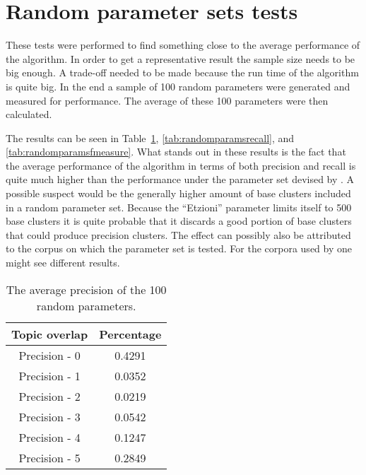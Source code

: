 \section{Random parameter sets tests}

These tests were performed to find something close to the average performance of the algorithm. In order to get a representative result the sample size needs to be big enough. A trade-off needed to be made because the run time of the algorithm is quite big. In the end a sample of 100 random parameters were generated and measured for performance. The average of these 100 parameters were then calculated.

The results can be seen in Table~\ref{tab:randomparamsprecision}, \ref{tab:randomparamsrecall}, and \ref{tab:randomparamsfmeasure}. What stands out in these results is the fact that the average performance of the algorithm in terms of both precision and recall is quite much higher than the performance under the parameter set devised by \cite{Oren1998}. A possible suspect would be the generally higher amount of base clusters included in a random parameter set. Because the ``Etzioni'' parameter limits itself to 500 base clusters it is quite probable that it discards a good portion of base clusters that could produce precision clusters. The effect can possibly also be attributed to the corpus on which the parameter set is tested. For the corpora used by \cite{Oren1998} one might see different results.

\begin{table}[H]
\begin{center}
\begin{tabular}{|c|c|}
\hline
Topic overlap & Percentage\\ 
\hline
Precision - 0 & 0.4291\\
Precision - 1 & 0.0352\\
Precision - 2 & 0.0219\\
Precision - 3 & 0.0542\\
Precision - 4 & 0.1247\\
Precision - 5 & 0.2849\\
\hline
\end{tabular}
\end{center}
\caption{The average precision of the 100 random parameters.}
\label{tab:randomparamsprecision}
\end{table}


